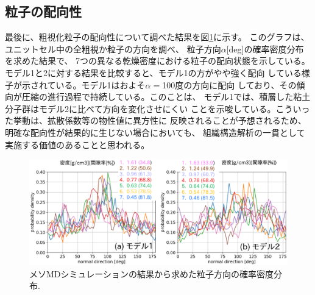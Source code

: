 \subsection{粒子の配向性}
最後に、粗視化粒子の配向性について調べた結果を図\ref{fig:fig9}に示す。
このグラフは、ユニットセル中の全粗視か粒子の方向を調べ、
粒子方向$\alpha$[deg]の確率密度分布を求めた結果で、
7つの異なる乾燥密度における粒子の配向状態を示している。
モデル1と2に対する結果を比較すると、モデル1の方がやや強く配向
している様子が示されている。モデル1はおよそ$\alpha=$100度の方向に配向
しており、その傾向が圧縮の進行過程で持続している。このことは、
モデル1では、積層した粘土分子群はモデル2に比べて方向を変化させにくい
ことを示唆している。こういった挙動は、拡散係数等の物性値に異方性に
反映されることが予想されるため、明確な配向性が結果的に生じない場合においても、
組織構造解析の一貫として実施する価値のあることと思われる。
\begin{figure}[h]
	\begin{center}
	\includegraphics[width=1.0\linewidth]{Figs/fig9.eps} 
	\end{center}
	\caption{
		メソMDシミュレーションの結果から求めた粒子方向の確率密度分布.
	} 
	\label{fig:fig9}
\end{figure}
